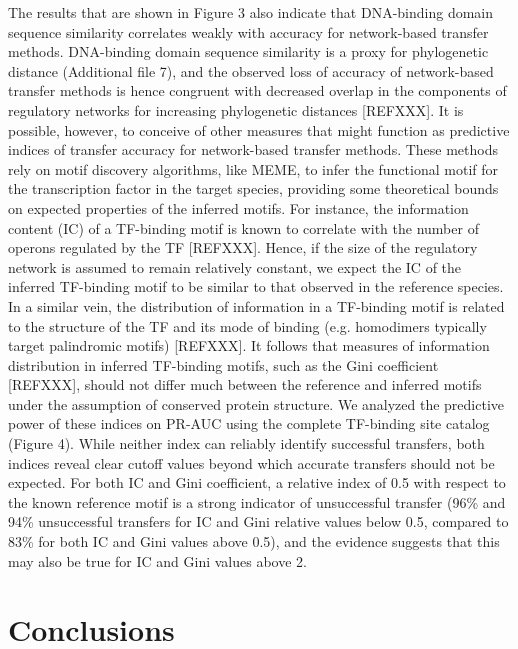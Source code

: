 The results that are shown in Figure 3 also indicate that DNA-binding domain
sequence similarity correlates weakly with accuracy for network-based transfer
methods. DNA-binding domain sequence similarity is a proxy for phylogenetic
distance (Additional file 7), and the observed loss of accuracy of
network-based transfer methods is hence congruent with decreased overlap in the
components of regulatory networks for increasing phylogenetic distances
[REFXXX]. It is possible, however, to conceive of other measures that might
function as predictive indices of transfer accuracy for network-based transfer
methods. These methods rely on motif discovery algorithms, like MEME, to infer
the functional motif for the transcription factor in the target species,
providing some theoretical bounds on expected properties of the inferred
motifs. For instance, the information content (IC) of a TF-binding motif is
known to correlate with the number of operons regulated by the TF
[REFXXX]. Hence, if the size of the regulatory network is assumed to remain
relatively constant, we expect the IC of the inferred TF-binding motif to be
similar to that observed in the reference species. In a similar vein, the
distribution of information in a TF-binding motif is related to the structure
of the TF and its mode of binding (e.g. homodimers typically target palindromic
motifs) [REFXXX]. It follows that measures of information distribution in
inferred TF-binding motifs, such as the Gini coefficient [REFXXX], should not
differ much between the reference and inferred motifs under the assumption of
conserved protein structure. We analyzed the predictive power of these indices
on PR-AUC using the complete TF-binding site catalog (Figure 4). While neither
index can reliably identify successful transfers, both indices reveal clear
cutoff values beyond which accurate transfers should not be expected. For both
IC and Gini coefficient, a relative index of 0.5 with respect to the known
reference motif is a strong indicator of unsuccessful transfer (96\% and 94\%
unsuccessful transfers for IC and Gini relative values below 0.5, compared to
83\% for both IC and Gini values above 0.5), and the evidence suggests that
this may also be true for IC and Gini values above 2.

\section{Conclusions}


